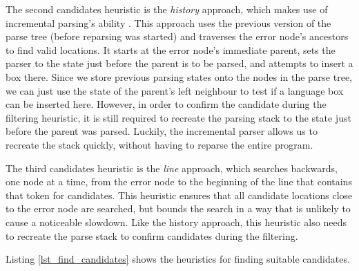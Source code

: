\documentclass[sigplan,screen]{acmart}\settopmatter{printfolios=true,printccs=false,printacmref=false}
\begin{document}
The second candidates heuristic is the \emph{history} approach, which makes
use of incremental parsing's ability  . This approach
uses the previous version of the parse tree (before reparsing was started) and
traverses the error node's ancestors to find valid locations. It starts at the
error node's immediate parent, sets the parser to the state just before the
parent is to be parsed, and attempts to insert a box there. Since we store
previous parsing states onto the nodes in the parse tree, we can just use the
state of the parent's left neighbour to test if a language box can be inserted
here. However, in order to confirm the candidate during the filtering
heuristic, it is still required to recreate the parsing stack to the state just
before the parent was parsed. Luckily, the incremental parser allows us to recreate
the stack quickly, without having to reparse the entire program.

The third candidates heuristic is the \emph{line} approach, which searches
backwards, one node at a time, from the error node to the beginning of the line
that contains that token for candidates. This heuristic ensures that all
candidate locations close to the error node are searched, but bounds the search
in a way that is unlikely to cause a noticeable slowdown. Like the history
approach, this heuristic also needs to recreate the parse stack to confirm
candidates during the filtering.

Listing \ref{lst_find_candidates} shows the heuristics for finding suitable
candidates.
\end{document}

